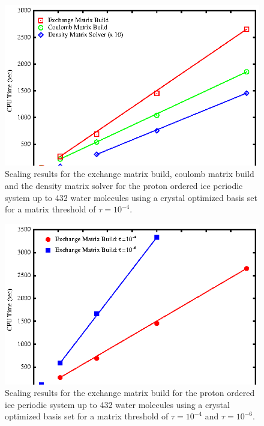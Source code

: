 \documentclass[prb,aps,nobibnotes,twocolumn,doublespace,twocolumngrid,superbib]{revtex4}
\begin{document}
%
%
%
\begin{figure}
\caption{Scaling results for the exchange matrix build, coulomb matrix
build and the density matrix solver  for the proton ordered ice periodic system up to 432 water molecules 
using a crystal optimized basis set\cite{CBS:511G:H,CBS:861G:MgO} for a matrix threshold of $\tau=10^{-4}$.}
\label{figure:Scaling_Matrix_Build_Ice_1}
{\centering \includegraphics{Timing_pIce_ONX_1.ps} \par} 
\end{figure}
%
%
%
\begin{figure}
\caption{Scaling results for the exchange matrix
build  for the proton ordered ice periodic system up to 432 water molecules 
using a crystal optimized basis set\cite{CBS:511G:H,CBS:861G:MgO} for a matrix threshold of 
$\tau=10^{-4}$ and  $\tau=10^{-6}$.}
\label{figure:Scaling_Matrix_Build_Ice_2}
{\centering \includegraphics{Timing_pIce_ONX_2.ps} \par} 
\end{figure}
\end{document}
